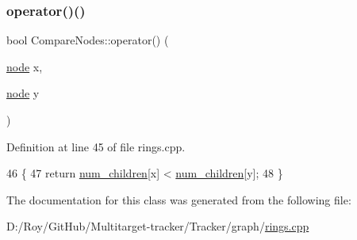 \subsubsection{\texorpdfstring{operator()()}{operator()()}}
{\footnotesize\ttfamily bool Compare\+Nodes\+::operator() (\begin{DoxyParamCaption}\item[{\mbox{\hyperlink{classnode}{node}}}]{x,  }\item[{\mbox{\hyperlink{classnode}{node}}}]{y }\end{DoxyParamCaption})\hspace{0.3cm}{\ttfamily [inline]}}



Definition at line 45 of file rings.\+cpp.


\begin{DoxyCode}
46     \{
47         \textcolor{keywordflow}{return} \mbox{\hyperlink{rings_8cpp_a021486f59a5a82e4020e5f4ce19b57a9}{num\_children}}[x] < \mbox{\hyperlink{rings_8cpp_a021486f59a5a82e4020e5f4ce19b57a9}{num\_children}}[y];
48     \}
\end{DoxyCode}


The documentation for this class was generated from the following file\+:\begin{DoxyCompactItemize}
\item 
D\+:/\+Roy/\+Git\+Hub/\+Multitarget-\/tracker/\+Tracker/graph/\mbox{\hyperlink{rings_8cpp}{rings.\+cpp}}\end{DoxyCompactItemize}
